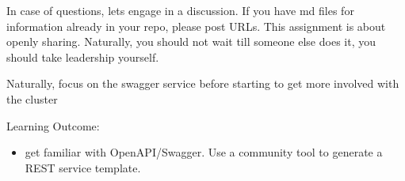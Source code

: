 \begin{exercise}
\begin{itemize}
\begin{itemize}
  \end{itemize}
 \end{itemize}
 
In case of questions, lets engage in a discussion. If you have md
files for information already in your repo, please post URLs. This
assignment is about openly sharing. Naturally, you should not wait
till someone else does it, you should take leadership yourself.

 
Naturally, focus on the swagger service before starting to get more
involved with the cluster

\end{exercise}

Learning Outcome:

\begin{itemize}
\item get familiar with OpenAPI/Swagger. Use a community tool to
  generate a REST service template. 
\end{itemize}

